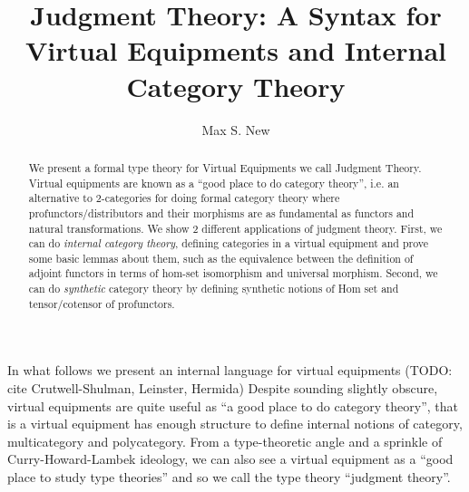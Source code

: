 \documentclass{article}
\begin{document}
\newtheorem{theorem}{Theorem}
\newtheorem{lemma}{Lemma}
\newtheorem{construction}{Construction}
\newtheorem{definition}{Definition}
\newcommand{\pto}{\nrightarrow}
\newcommand{\pfrom}{\nleftarrow}
\newcommand{\vcat}{\mathcal}
\newcommand{\cat}{\mathbbm}
\newcommand{\vtkmnd}{\mathbb{K}\text{Mod} (\vcat{V},T)}
\newcommand{\rmod}{\text{RMod}}
\newcommand{\lmod}{\text{LMod}}

\newcommand{\id}{\text{id}}
\newcommand{\for}{\text{for}\,}
\newcommand{\when}{\text{when}\,}
\newcommand{\lett}{\text{let}\,}
\newcommand{\sort}{\,\text{sort}}
\newcommand{\ctx}{\,\text{context}}
\newcommand{\pipe}{\mathrel{|}}

\title{Judgment Theory: A Syntax for Virtual Equipments and Internal Category Theory}
\author{Max S. New}

\maketitle

\begin{abstract}
  We present a formal type theory for Virtual Equipments we call
  Judgment Theory. Virtual equipments are known as a ``good place to
  do category theory'', i.e. an alternative to 2-categories for doing
  formal category theory where profunctors/distributors and their
  morphisms are as fundamental as functors and natural
  transformations. We show 2 different applications of judgment
  theory. First, we can do \emph{internal category theory}, defining
  categories in a virtual equipment and prove some basic lemmas about
  them, such as the equivalence between the definition of adjoint
  functors in terms of hom-set isomorphism and universal
  morphism. Second, we can do \emph{synthetic} category theory by
  defining synthetic notions of Hom set and tensor/cotensor of
  profunctors.
\end{abstract}

In what follows we present an internal language for virtual equipments
(TODO: cite Crutwell-Shulman, Leinster, Hermida)
%
Despite sounding slightly obscure, virtual equipments are quite useful
as ``a good place to do category theory'', that is a virtual equipment
has enough structure to define internal notions of category,
multicategory and polycategory.
%
From a type-theoretic angle and a sprinkle of Curry-Howard-Lambek
ideology, we can also see a virtual equipment as a ``good place to
study type theories'' and so we call the type theory ``judgment
theory''.
\end{document}
